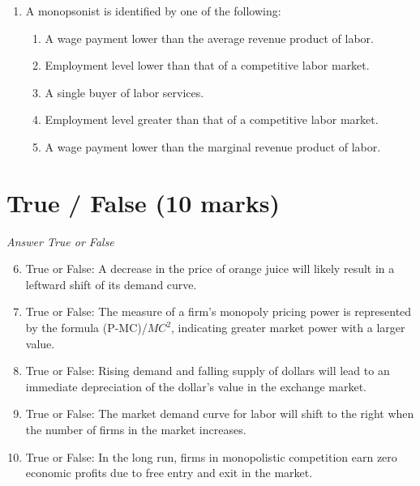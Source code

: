 \documentclass[12pt]{article}
\begin{document}
\begin{enumerate}[label=\arabic*.]
\begin{enumerate}[label=(\alph*)]
    \item k x T
    \item T x k
    \item T x k x 1
    \item T x T
    \item 1 x 1
\end{enumerate}
\item A monopsonist is identified by one of the following:
\begin{enumerate}[label=(\alph*)]
    \item A wage payment lower than the average revenue product of labor.
    \item Employment level lower than that of a competitive labor market.
    \item A single buyer of labor services.
    \item Employment level greater than that of a competitive labor market.
    \item A wage payment lower than the marginal revenue product of labor.
\end{enumerate}
\end{enumerate}

\section*{True / False (10 marks)}
\textit{Answer True or False}
\begin{enumerate}[label=\arabic*.]
\setcounter{enumi}{5}
\item True or False: A decrease in the price of orange juice will likely result in a leftward shift of its demand curve.
\item True or False: The measure of a firm's monopoly pricing power is represented by the formula (P-MC)/$MC^2$, indicating greater market power with a larger value.
\item True or False: Rising demand and falling supply of dollars will lead to an immediate depreciation of the dollar's value in the exchange market.
\item True or False: The market demand curve for labor will shift to the right when the number of firms in the market increases.
\item True or False: In the long run, firms in monopolistic competition earn zero economic profits due to free entry and exit in the market.
\end{enumerate}
\end{document}
